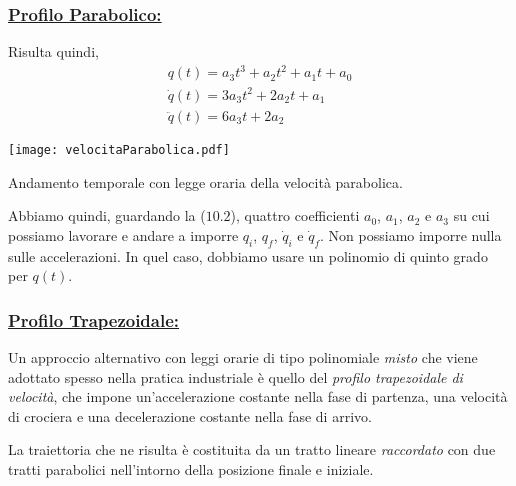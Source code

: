 \subsubsection{\underline{Profilo Parabolico:}}
Risulta quindi,
\begin{align}
	q(t) = a_3 t^3 + a_2 t^2 + a_1 t + a_0 \\
	\dot{q}(t) = 3 a_3 t^2 + 2 a_2 t + a_1 \\
	\ddot{q}(t) = 6 a_3 t + 2 a_2
\end{align}

\begin{center}
	\texttt{[image: velocitaParabolica.pdf]}
	\caption{Andamento temporale con legge oraria della velocità parabolica.}
\end{center}
Abbiamo quindi, guardando la ($10.2$), quattro coefficienti $a_0$, $a_1$, $a_2$ e $a_3$ su cui possiamo lavorare e andare a imporre $q_i$, $q_f$, $\dot{q}_i$ e $\dot{q}_f$. Non possiamo imporre nulla sulle accelerazioni. In quel caso, dobbiamo usare un polinomio di quinto grado per $q(t)$.

\subsubsection{\underline{Profilo Trapezoidale:}}
Un approccio alternativo con leggi orarie di tipo polinomiale \emph{misto} che viene adottato spesso nella pratica industriale è quello del \emph{profilo trapezoidale di velocità}, che impone un'accelerazione costante nella fase di partenza, una velocità di crociera e una decelerazione costante nella fase di arrivo.

La traiettoria che ne risulta è costituita da un tratto lineare \emph{raccordato} con due tratti parabolici nell'intorno della posizione finale e iniziale.

